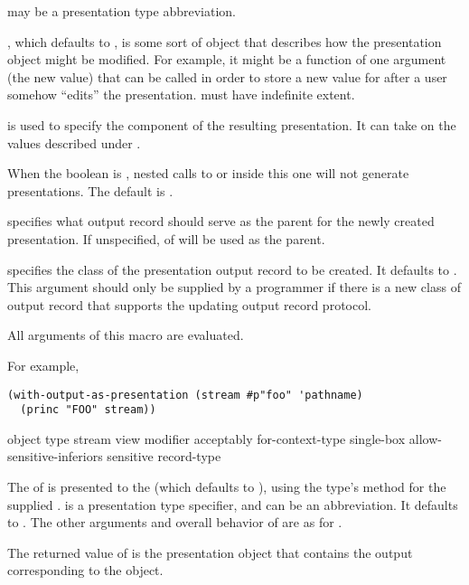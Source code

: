  may be a presentation type abbreviation.

, which defaults to , is some sort of object that
describes how the presentation object might be modified.  For example, it might
be a function of one argument (the new value) that can be called in order to
store a new value for  after a user somehow ``edits'' the
presentation.   must have indefinite extent.

 is used to specify the  component
of the resulting presentation.  It can take on the values described under
.

When the boolean  is , nested calls
to  or  inside this one will not
generate presentations.  The default is .

 specifies what output record should serve as the parent for the
newly created presentation.  If unspecified, 
of  will be used as the parent.

 specifies the class of the presentation output record to be
created.  It defaults to .  This argument should only
be supplied by a programmer if there is a new class of output record that
supports the updating output record protocol.

All arguments of this macro are evaluated.

For example,
\begin{verbatim}
(with-output-as-presentation (stream #p"foo" 'pathname)
  (princ "FOO" stream))
\end{verbatim}


 {object \optional type
                  \key stream view modifier acceptably for-context-type
                       single-box allow-sensitive-inferiors sensitive record-type}

The  of   is presented to the
  (which defaults to
), using the type's  method for the supplied
 .   is a presentation type specifier, and can be
an abbreviation.  It defaults to .  The
other arguments and overall behavior of  are as for
.

The returned value of  is the presentation object that contains the
output corresponding to the object.

